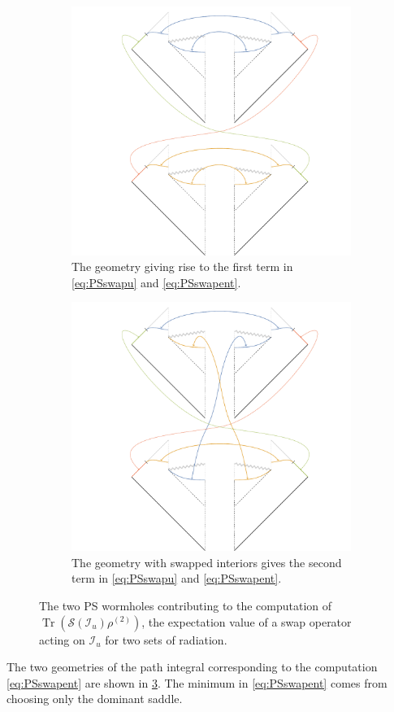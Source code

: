 \documentclass[letterpaper,12pt]{article}
\DeclareMathOperator{\Tr}{Tr}
\newcommand*{\scri}{\mathscr{I}} %
\newcommand*{\swap}{\mathcal{S}} %
\begin{document}
\begin{figure}
\centering
\begin{subfigure}[t]{.48\textwidth}\centering
	\includegraphics[width=.9\textwidth]{PSswapu1}
	\caption{The geometry giving rise to the first term in \eqref{eq:PSswapu} and  \eqref{eq:PSswapent}.}
\label{fig:PSswapua}
\end{subfigure}
\hfill
\begin{subfigure}[t]{.48\textwidth}\centering
	\includegraphics[width=.9\textwidth]{PSswapu2}
		\caption{The geometry with swapped interiors gives the second term in \eqref{eq:PSswapu} and  \eqref{eq:PSswapent}.}
\label{fig:PSswapub}
\end{subfigure}
\caption{The two PS wormholes contributing to the computation of $\Tr \left( \swap(\scri_u) \rho^{(2)} \right)$, the expectation value of a swap operator acting on $\scri_u$ for two sets of radiation. \label{fig:PSswapu}}
\end{figure}
The two geometries of the path integral corresponding to the computation \eqref{eq:PSswapent} are shown in \ref{fig:PSswapu}. The minimum in \eqref{eq:PSswapent} comes from choosing only the dominant saddle.
\end{document}
